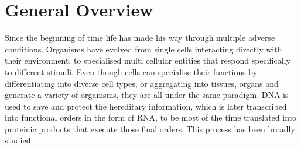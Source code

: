 \chapter{General Overview}

Since the beginning of time life has made his way through multiple adverse conditions. Organisms have evolved from single cells interacting directly with their environment, to specialised multi cellular entities that respond specifically to different stimuli. Even though cells can specialise their functions by differentiating into diverse cell types, or aggregating into tissues, organs and generate a variety of organisms, they are all under the same paradigm. DNA is used to save and protect the hereditary information, which is later transcribed into functional orders in the form of RNA, to be most of the time translated into proteinic products that execute those final orders. 
This process has been broadly studied 


